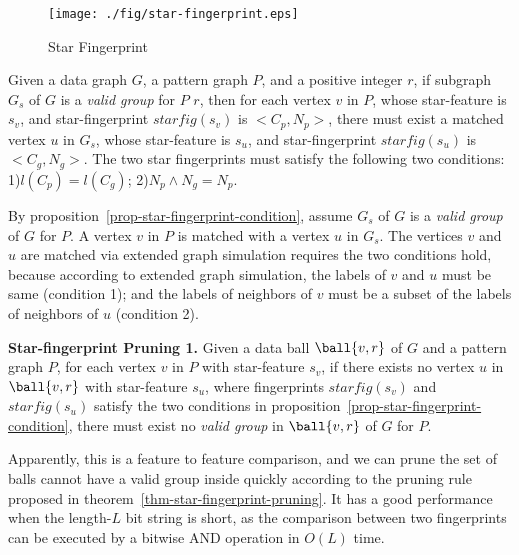 \begin{figure}[tb!]
\begin{center}
\texttt{[image: ./fig/star-fingerprint.eps]}
\caption{Star Fingerprint}
\label{fig-starfingerprint-example}
\end{center}
\end{figure}


\begin{prop}
\label{prop-star-fingerprint-condition}
Given a data graph $G$, a pattern graph $P$, and a positive integer $r$, if subgraph $G_{s}$ of $G$ is a {\em valid group} for $P$ \wrt $r$, then for each vertex $v$ in $P$, whose star-feature is $s_v$, and star-fingerprint $starfig(s_v)$ is $<C_p,N_p>$, there must exist a matched vertex $u$ in $G_{s}$, whose star-feature is $s_u$, and star-fingerprint $starfig(s_u)$ is $<C_g,N_g>$. The two star fingerprints must satisfy the following two conditions: 1)$l(C_p)=l(C_g)$; 2)$N_p \wedge N_g = N_p$.
\end{prop}

By proposition~\ref{prop-star-fingerprint-condition}, assume $G_{s}$ of $G$ is a {\em valid group} of $G$ for $P$. A vertex $v$ in $P$ is matched with a vertex $u$ in $G_{s}$. The vertices $v$ and $u$ are matched via extended graph simulation requires the two conditions hold, because according to extended graph simulation, the labels of $v$ and $u$ must be same (condition 1); and the labels of neighbors of $v$ must be a subset of the labels of neighbors of $u$ (condition 2).

\begin{theorem} {\textbf{Star-fingerprint Pruning 1.}}
\label{thm-star-fingerprint-pruning}
Given a data ball $\ball{v, r}$ of $G$ and a pattern graph $P$, for each vertex $v$ in $P$ with star-feature $s_v$, if there exists no vertex $u$ in $\ball{v, r}$ with star-feature $s_u$, where fingerprints $starfig(s_v)$ and $starfig(s_u)$ satisfy the two conditions in proposition~\ref{prop-star-fingerprint-condition}, there must exist no {\em valid group} in $\ball{v, r}$ of $G$ for $P$.
\end{theorem}

Apparently, this is a feature to feature comparison, and we can prune the set of balls cannot have a valid group inside quickly according to the pruning rule proposed in  theorem~\ref{thm-star-fingerprint-pruning}. It has a good performance when the length-$L$ bit string is short, as the comparison between two fingerprints can be executed by a bitwise AND operation in $O(L)$ time.

